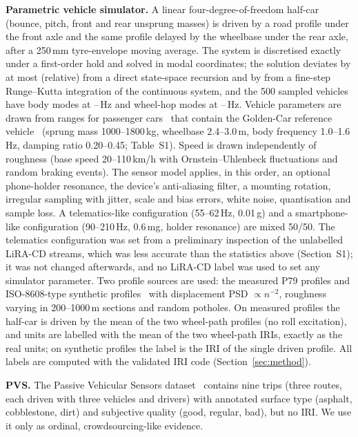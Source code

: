 \textbf{Parametric vehicle simulator.}
A linear four-degree-of-freedom half-car (bounce, pitch, front and rear unsprung masses) is driven by a road profile under the front axle and the same profile delayed by the wheelbase under the rear axle, after a 250\,mm tyre-envelope moving average.
The system is discretised exactly under a first-order hold and solved in modal coordinates; the solution deviates by at most \simModalDev{} (relative) from a direct state-space recursion and by \simRkDev{} from a fine-step Runge--Kutta integration of the continuous system, and the 500 sampled vehicles have body modes at \simBodyHzLo--\simBodyHzHi\,Hz and wheel-hop modes at \simHopHzLo--\simHopHzHi\,Hz.
Vehicle parameters are drawn from ranges for passenger cars~\cite{gillespie1992} that contain the Golden-Car reference vehicle~\cite{sayers1986tp45} (sprung mass 1000--1800\,kg, wheelbase 2.4--3.0\,m, body frequency 1.0--1.6\,Hz, damping ratio 0.20--0.45; Table~S1).
Speed is drawn independently of roughness (base speed 20--110\,km/h with Ornstein--Uhlenbeck fluctuations and random braking events).
The sensor model applies, in this order, an optional phone-holder resonance, the device's anti-aliasing filter, a mounting rotation, irregular sampling with jitter, scale and bias errors, white noise, quantisation and sample loss.
A telematics-like configuration (55--62\,Hz, 0.01\,g) and a smartphone-like configuration (90--210\,Hz, 0.6\,mg, holder resonance) are mixed 50/50.
The telematics configuration was set from a preliminary inspection of the unlabelled LiRA-CD streams, which was less accurate than the statistics above (Section~S1); it was not changed afterwards, and no LiRA-CD label was used to set any simulator parameter.
Two profile sources are used: the measured P79 profiles and ISO-8608-type synthetic profiles~\cite{iso8608} with displacement PSD $\propto n^{-2}$, roughness varying in 200--1000\,m sections and random potholes.
On measured profiles the half-car is driven by the mean of the two wheel-path profiles (no roll excitation), and units are labelled with the mean of the two wheel-path IRIs, exactly as the real units; on synthetic profiles the label is the IRI of the single driven profile.
All labels are computed with the validated IRI code (Section~\ref{sec:method}).

\textbf{PVS.}
The Passive Vehicular Sensors dataset~\cite{menegazzo2020pvs,menegazzo2021pvs} contains nine trips (three routes, each driven with three vehicles and drivers) with annotated surface type (asphalt, cobblestone, dirt) and subjective quality (good, regular, bad), but no IRI.
We use it only as ordinal, crowdsourcing-like evidence.

